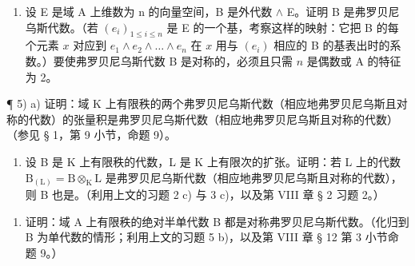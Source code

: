 \begin{enumerate}
\def\labelenumi{\alph{enumi})}
\setcounter{enumi}{1}
\tightlist
\item
  设 E 是域 A 上维数为 n 的向量空间，B 是外代数 \(\wedge\) E。证明 B 是弗罗贝尼乌斯代数。（若 \((e_i)_{1 \leqslant i \leqslant n}\) 是 E 的一个基，考察这样的映射：它把 B 的每个元素 \(x\) 对应到 \(e_1 \wedge e_2 \wedge \ldots \wedge e_n\) 在 \(x\) 用与 \((e_i)\) 相应的 B 的基表出时的系数。）要使弗罗贝尼乌斯代数 B 是对称的，必须且只需 \(n\) 是偶数或 A 的特征为 2。
\end{enumerate}

¶ 5) a) 证明：域 K 上有限秩的两个弗罗贝尼乌斯代数（相应地弗罗贝尼乌斯且对称的代数）的张量积是弗罗贝尼乌斯代数（相应地弗罗贝尼乌斯且对称的代数）（参见 § 1，第 9 小节，命题 9）。

\begin{enumerate}
\def\labelenumi{\alph{enumi})}
\setcounter{enumi}{1}
\tightlist
\item
  设 B 是 K 上有限秩的代数，L 是 K 上有限次的扩张。证明：若 L 上的代数 \(\mathrm{B}_{(\mathrm{L})} = \mathrm{B} \otimes_{\mathrm{K}} \mathrm{L}\) 是弗罗贝尼乌斯代数（相应地弗罗贝尼乌斯且对称的代数），则 B 也是。（利用上文的习题 2 c) 与 3 c)，以及第 VIII 章 § 2 习题 2。）
\end{enumerate}

\begin{enumerate}
\def\labelenumi{\arabic{enumi})}
\setcounter{enumi}{5}
\tightlist
\item
  证明：域 A 上有限秩的绝对半单代数 B 都是对称弗罗贝尼乌斯代数。（化归到 B 为单代数的情形；利用上文的习题 5 b)，以及第 VIII 章 § 12 第 3 小节命题 9。）
\end{enumerate}


